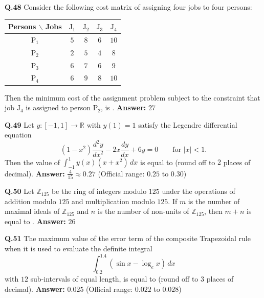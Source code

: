 \documentclass[11pt,a4paper]{article}
\newcommand{\ans}[1]{\textbf{Answer:} #1\par\medskip}
\begin{document}
\textbf{Q.48} Consider the following cost matrix of assigning four jobs to four persons:
\begin{center}
\begin{tabular}{c|cccc}
\toprule
Persons $\backslash$ Jobs & $\text{J}_1$ & $\text{J}_2$ & $\text{J}_3$ & $\text{J}_4$ \\
\midrule
$\text{P}_1$ & $5$ & $8$ & $6$ & $10$ \\
$\text{P}_2$ & $2$ & $5$ & $4$ & $8$ \\
$\text{P}_3$ & $6$ & $7$ & $6$ & $9$ \\
$\text{P}_4$ & $6$ & $9$ & $8$ & $10$ \\
\bottomrule
\end{tabular}
\end{center}
Then the minimum cost of the assignment problem subject to the constraint that job $\text{J}_4$ is assigned to person $\text{P}_2$, is \underline{\hspace{2cm}}.
\ans{$27$}

\textbf{Q.49} Let $y : [-1, 1] \to \mathbb{R}$ with $y(1) = 1$ satisfy the Legendre differential equation
\[
  (1 - x^2)\frac{d^2 y}{dx^2} - 2x\frac{dy}{dx} + 6y = 0 \qquad \text{for } |x| < 1.
\]
Then the value of $\displaystyle\int_{-1}^{1} y(x)(x + x^2)\,dx$ is equal to \underline{\hspace{2cm}} (round off to $2$ places of decimal).
\ans{$\frac{4}{15} \approx 0.27$ (Official range: $0.25$ to $0.30$)}

\textbf{Q.50} Let $\mathbb{Z}_{125}$ be the ring of integers modulo $125$ under the operations of addition modulo $125$ and multiplication modulo $125$. If $m$ is the number of maximal ideals of $\mathbb{Z}_{125}$ and $n$ is the number of non-units of $\mathbb{Z}_{125}$, then $m + n$ is equal to \underline{\hspace{2cm}}.
\ans{$26$}

\textbf{Q.51} The maximum value of the error term of the composite Trapezoidal rule when it is used to evaluate the definite integral
\[
  \int_{0.2}^{1.4} (\sin x - \log_e x)\,dx
\]
with $12$ sub-intervals of equal length, is equal to \underline{\hspace{2cm}} (round off to $3$ places of decimal).
\ans{$0.025$ (Official range: $0.022$ to $0.028$)}
\end{document}
